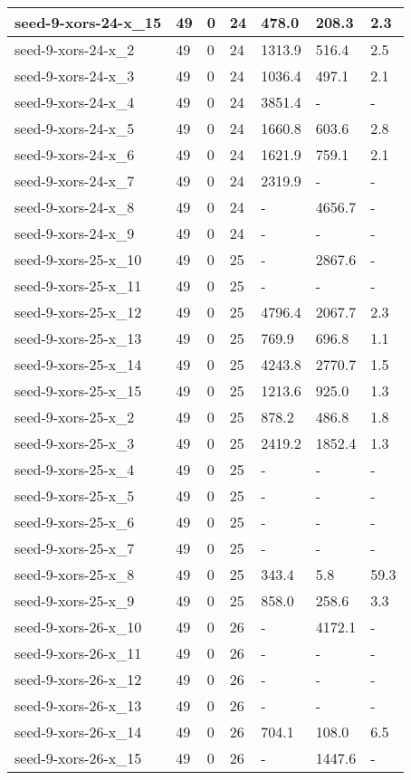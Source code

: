 \begin{scriptsize}
\begin{longtable}{|p{5cm}|l|l|l|l|l|l|}
seed-9-xors-24-x\_15&49&0&24&478.0&208.3&2.3 \\ \hline 
seed-9-xors-24-x\_2&49&0&24&1313.9&516.4&2.5 \\ \hline 
seed-9-xors-24-x\_3&49&0&24&1036.4&497.1&2.1 \\ \hline 
seed-9-xors-24-x\_4&49&0&24&3851.4&-&- \\ \hline 
seed-9-xors-24-x\_5&49&0&24&1660.8&603.6&2.8 \\ \hline 
seed-9-xors-24-x\_6&49&0&24&1621.9&759.1&2.1 \\ \hline 
seed-9-xors-24-x\_7&49&0&24&2319.9&-&- \\ \hline 
seed-9-xors-24-x\_8&49&0&24&-&4656.7&- \\ \hline 
seed-9-xors-24-x\_9&49&0&24&-&-&- \\ \hline 
seed-9-xors-25-x\_10&49&0&25&-&2867.6&- \\ \hline 
seed-9-xors-25-x\_11&49&0&25&-&-&- \\ \hline 
seed-9-xors-25-x\_12&49&0&25&4796.4&2067.7&2.3 \\ \hline 
seed-9-xors-25-x\_13&49&0&25&769.9&696.8&1.1 \\ \hline 
seed-9-xors-25-x\_14&49&0&25&4243.8&2770.7&1.5 \\ \hline 
seed-9-xors-25-x\_15&49&0&25&1213.6&925.0&1.3 \\ \hline 
seed-9-xors-25-x\_2&49&0&25&878.2&486.8&1.8 \\ \hline 
seed-9-xors-25-x\_3&49&0&25&2419.2&1852.4&1.3 \\ \hline 
seed-9-xors-25-x\_4&49&0&25&-&-&- \\ \hline 
seed-9-xors-25-x\_5&49&0&25&-&-&- \\ \hline 
seed-9-xors-25-x\_6&49&0&25&-&-&- \\ \hline 
seed-9-xors-25-x\_7&49&0&25&-&-&- \\ \hline 
seed-9-xors-25-x\_8&49&0&25&343.4&5.8&59.3 \\ \hline 
seed-9-xors-25-x\_9&49&0&25&858.0&258.6&3.3 \\ \hline 
seed-9-xors-26-x\_10&49&0&26&-&4172.1&- \\ \hline 
seed-9-xors-26-x\_11&49&0&26&-&-&- \\ \hline 
seed-9-xors-26-x\_12&49&0&26&-&-&- \\ \hline 
seed-9-xors-26-x\_13&49&0&26&-&-&- \\ \hline 
seed-9-xors-26-x\_14&49&0&26&704.1&108.0&6.5 \\ \hline 
seed-9-xors-26-x\_15&49&0&26&-&1447.6&- \\ \hline 

\end{longtable}
\end{scriptsize}
